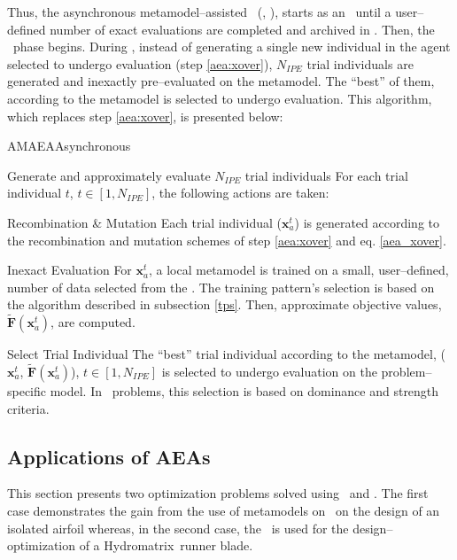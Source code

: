 \documentclass{vki_ls}
\newcommand{\vect}[1]{\bm{#1}}
\newcommand{\apprx}[1]{\tilde{#1}}
\begin{document}
Thus, the asynchronous metamodel--assisted \EA\ (\AMAEA, \cite{LTT_2_045}), 
starts as an \AEA\ until a user--defined number of exact evaluations are 
completed and archived in \DB. Then, the \IPE\ phase begins. 
During \IPE, instead of generating a single new individual in the agent 
selected to undergo evaluation (step \ref{aea:xover}), $N_{IPE}$ trial 
individuals are generated and inexactly pre--evaluated on the metamodel. 
The ``best'' of them, according to the metamodel is selected to undergo evaluation. 
This algorithm, which replaces step \ref{aea:xover}, is presented below:
%
\begin{namedalgorithm}{AMAEA}{Asynchronous \MAEA}{}
\item[Generate and approximately evaluate $N_{IPE}$ trial individuals]
For each trial individual $t$, $t\!\in\![1,N_{IPE}]$, the following
actions are taken:
%
\begin{algorithm}
\item[Recombination \& Mutation]
Each trial individual ($\vect{x}_a^t$) is generated according to the
recombination and mutation schemes of step \ref{aea:xover} and eq.
\ref{aea_xover}.
%
\item[Inexact Evaluation]
For $\vect{x}_a^t$, a local metamodel is trained on a small, user--defined, number of data selected from the \DB. The training pattern's selection is based on the algorithm described in subsection \ref{tps}. Then, approximate objective values, $\apprx{\vect{F}}(\vect{x}_a^t)$, are computed.
\end{algorithm}
%
\item[Select Trial Individual] 
The ``best'' trial individual according to the metamodel, ($\vect{x}_a^t$, $\apprx{\vect{F}}(\vect{x}_a^t)$), $t\!\in\![1,N_{IPE}]$ is selected to undergo evaluation on the problem--specific model. 
In \MOO\ problems, this selection is based on dominance and strength criteria.
\end{namedalgorithm}

%
\subsection{Applications of AEAs}

This section presents two optimization problems solved using \AEAs\ and \AMAEAs. 
The first case demonstrates the gain from the use of metamodels on \AEA\ on the design of an isolated airfoil whereas, in the second case, the \AMAEA\ is used for the design--optimization of a Hydromatrix\textregistered~runner blade.
\end{document}
